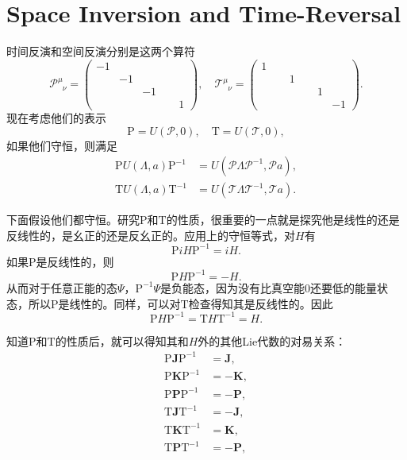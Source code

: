 \section{Space Inversion and Time-Reversal}
时间反演和空间反演分别是这两个算符
\[
\mathscr{P}^\mu_{\phantom{\mu}\nu}=\begin{pmatrix}-1&&&\\&-1&&\\&&-1&\\&&&\phantom{-}1 \end{pmatrix},
\quad \mathscr{T}^\mu_{\phantom{\mu}\nu}=\begin{pmatrix}1&&&\\&\phantom{-}1&&\\&&\phantom{-}1&\\&&&-1 \end{pmatrix}.
\]
现在考虑他们的表示
\[
\mathrm{P}=U(\mathscr{P},0),\quad \mathrm{T}=U(\mathscr{T},0),
\]
如果他们守恒，则满足
\[
\begin{split}
\mathrm{P}U(\Lambda,a)\mathrm{P}^{-1}&=U(\mathscr{P}\Lambda\mathscr{P}^{-1},\mathscr{P}a),\\
\mathrm{T}U(\Lambda,a)\mathrm{T}^{-1}&=U(\mathscr{T}\Lambda\mathscr{T}^{-1},\mathscr{T}a).
\end{split}
\]

下面假设他们都守恒。研究$\mathrm{P}$和$\mathrm{T}$的性质，很重要的一点就是探究他是线性的还是反线性的，是幺正的还是反幺正的。应用上的守恒等式，对$H$有
\[
\mathrm{P}iH\mathrm{P}^{-1}=iH.
\]
如果$\mathrm{P}$是反线性的，则
\[
\mathrm{P}H\mathrm{P}^{-1}=-H.
\]
从而对于任意正能的态$\Psi$，$\mathrm{P}^{-1}\Psi$是负能态，因为没有比真空能0还要低的能量状态，所以$\mathrm{P}$是线性的。同样，可以对$\mathrm{T}$检查得知其是反线性的。因此
\[
\mathrm{P}H\mathrm{P}^{-1}=\mathrm{T}H\mathrm{T}^{-1}=H.
\]

知道$\mathrm{P}$和$\mathrm{T}$的性质后，就可以得知其和$H$外的其他Lie代数的对易关系：
\[
\begin{split}
\mathrm{P}\bm{J}\mathrm{P}^{-1}&=\bm{J},\\
\mathrm{P}\bm{K}\mathrm{P}^{-1}&=-\bm{K},\\
\mathrm{P}\bm{P}\mathrm{P}^{-1}&=-\bm{P},\\
\mathrm{T}\bm{J}\mathrm{T}^{-1}&=-\bm{J},\\
\mathrm{T}\bm{K}\mathrm{T}^{-1}&=\bm{K},\\
\mathrm{T}\bm{P}\mathrm{T}^{-1}&=-\bm{P},\\
\end{split}
\]


